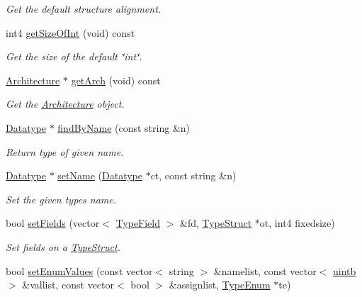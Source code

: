 \begin{DoxyCompactItemize}
\begin{DoxyCompactList}\small\item\em Get the default structure alignment. \end{DoxyCompactList}\item 
int4 \mbox{\hyperlink{class_type_factory_a8a7d719707e81a56b9871272296e0893}{get\+Size\+Of\+Int}} (void) const
\begin{DoxyCompactList}\small\item\em Get the size of the default \char`\"{}int\char`\"{}. \end{DoxyCompactList}\item 
\mbox{\hyperlink{class_architecture}{Architecture}} $\ast$ \mbox{\hyperlink{class_type_factory_a216789e9300282a12e6bf22a4354ba6e}{get\+Arch}} (void) const
\begin{DoxyCompactList}\small\item\em Get the \mbox{\hyperlink{class_architecture}{Architecture}} object. \end{DoxyCompactList}\item 
\mbox{\hyperlink{class_datatype}{Datatype}} $\ast$ \mbox{\hyperlink{class_type_factory_a5e139f5b338e423fd2b1beb7d941d30f}{find\+By\+Name}} (const string \&n)
\begin{DoxyCompactList}\small\item\em Return type of given name. \end{DoxyCompactList}\item 
\mbox{\hyperlink{class_datatype}{Datatype}} $\ast$ \mbox{\hyperlink{class_type_factory_a6a2c74462f5a832e6233421bb6cb1beb}{set\+Name}} (\mbox{\hyperlink{class_datatype}{Datatype}} $\ast$ct, const string \&n)
\begin{DoxyCompactList}\small\item\em Set the given types name. \end{DoxyCompactList}\item 
bool \mbox{\hyperlink{class_type_factory_a17480d8c1040602a1becb483e6c59652}{set\+Fields}} (vector$<$ \mbox{\hyperlink{struct_type_field}{Type\+Field}} $>$ \&fd, \mbox{\hyperlink{class_type_struct}{Type\+Struct}} $\ast$ot, int4 fixedsize)
\begin{DoxyCompactList}\small\item\em Set fields on a \mbox{\hyperlink{class_type_struct}{Type\+Struct}}. \end{DoxyCompactList}\item 
bool \mbox{\hyperlink{class_type_factory_a17cf58ac6b927a91b4f794a3347b2822}{set\+Enum\+Values}} (const vector$<$ string $>$ \&namelist, const vector$<$ \mbox{\hyperlink{types_8h_a2db313c5d32a12b01d26ac9b3bca178f}{uintb}} $>$ \&vallist, const vector$<$ bool $>$ \&assignlist, \mbox{\hyperlink{class_type_enum}{Type\+Enum}} $\ast$te)

\end{DoxyCompactItemize}
